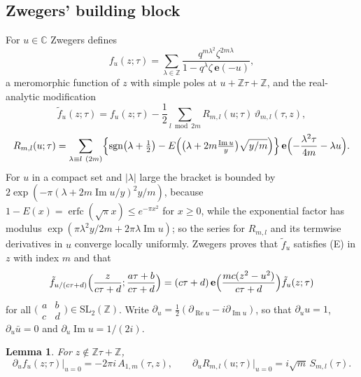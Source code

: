 \documentclass[11pt]{amsart}
\newtheorem{lemma}[theorem]{Lemma}
\theoremstyle{definition}
\newcommand{\ZZ}{\mathbb{Z}}
\newcommand{\CC}{\mathbb{C}}
\newcommand{\vt}{\vartheta}
\newcommand{\erfc}{\operatorname{erfc}}
\newcommand{\e}{\mathbf{e}}
\begin{document}
\subsection{Zwegers' building block}
For $u\in\CC$ Zwegers defines \cite[Def.~3.2]{Zwe02}
\[
f_u(z;\tau)=\sum_{\lambda\in\ZZ}\frac{q^{m\lambda^2}\zeta^{2m\lambda}}{1-q^\lambda\zeta\,\e(-u)},
\]
a meromorphic function of $z$ with simple poles at $u+\ZZ\tau+\ZZ$, and the real-analytic modification \cite[Def.~3.4]{Zwe02}
\[
\tilde f_u(z;\tau)=f_u(z;\tau)-\frac12\sum_{l\bmod 2m}R_{m,l}(u;\tau)\,\vt_{m,l}(\tau,z),
\]
\[
R_{m,l}(u;\tau)=\sum_{\lambda\equiv l\ (2m)}\Bigl\{\operatorname{sgn}\bigl(\lambda+\tfrac12\bigr)-E\Bigl(\bigl(\lambda+2m\tfrac{\operatorname{Im}u}{y}\bigr)\sqrt{y/m}\Bigr)\Bigr\}\,\e\Bigl(-\frac{\lambda^2\tau}{4m}-\lambda u\Bigr).
\]
For $u$ in a compact set and $|\lambda|$ large the bracket is bounded by $2\exp(-\pi(\lambda+2m\operatorname{Im}u/y)^2y/m)$, because $1-E(x)=\erfc(\sqrt\pi x)\le e^{-\pi x^2}$ for $x\ge0$, while the exponential factor has modulus $\exp(\pi\lambda^2y/2m+2\pi\lambda\operatorname{Im}u)$; so the series for $R_{m,l}$ and its termwise derivatives in $u$ converge locally uniformly. Zwegers proves \cite[Prop.~3.5]{Zwe02} that $\tilde f_u$ satisfies (E) in $z$ with index $m$ and that
\begin{equation}\label{eq:zwmod}
\tilde f_{u/(c\tau+d)}\Bigl(\frac{z}{c\tau+d};\frac{a\tau+b}{c\tau+d}\Bigr)=(c\tau+d)\,\e\Bigl(\frac{mc(z^2-u^2)}{c\tau+d}\Bigr)\tilde f_u(z;\tau)
\end{equation}
for all $\bigl(\begin{smallmatrix}a&b\\c&d\end{smallmatrix}\bigr)\in\mathrm{SL}_2(\ZZ)$. Write $\partial_u=\frac12(\partial_{\operatorname{Re}u}-i\partial_{\operatorname{Im}u})$, so that $\partial_u u=1$, $\partial_u\bar u=0$ and $\partial_u\operatorname{Im}u=1/(2i)$.

\begin{lemma}\label{lem:derivs}
For $z\notin\ZZ\tau+\ZZ$,
\[
\partial_uf_u(z;\tau)\big|_{u=0}=-2\pi i\,A_{1,m}(\tau,z),\qquad \partial_uR_{m,l}(u;\tau)\big|_{u=0}=i\sqrt m\,S_{m,l}(\tau).
\]
\end{lemma}
\end{document}
